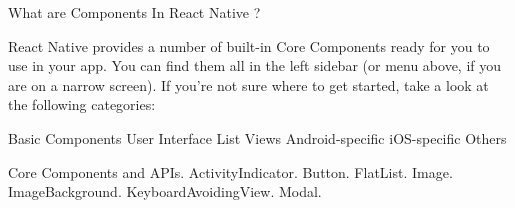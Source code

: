 What are Components In React Native ? 

React Native provides a number of built-in Core Components ready for 
you to use in your app. You can find them all in the left sidebar 
(or menu above, if you are on a narrow screen). If you're not sure where to 
get started, take a look at the following categories:

Basic Components
User Interface
List Views
Android-specific
iOS-specific
Others

Core Components and APIs.
ActivityIndicator.
Button.
FlatList.
Image.
ImageBackground.
KeyboardAvoidingView.
Modal.
